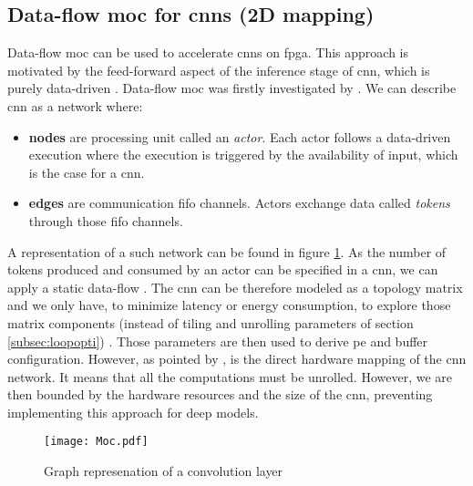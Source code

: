 \subsection{Data-flow \acrshort{moc} for \acrshort{cnn}s (2D mapping)}
%
%
Data-flow \acrfull{moc} can be used to accelerate \acrshort{cnn}s on \acrshort{fpga}. This approach is motivated by the feed-forward aspect of the inference stage of \acrshort{cnn}, which is purely data-driven \cite{abdelouahab_accelerating_2018}. Data-flow \acrfull{moc} was firstly investigated by \cite{lin_li_low_2016}.  We can describe \acrshort{cnn} as a network where:
\begin{itemize}
    \item \textbf{nodes} are processing unit called an \textit{actor}. Each actor follows a data-driven execution where the execution is triggered by the availability of input, which is the case for a \acrshort{cnn}.
    \item \textbf{edges} are communication \acrshort{fifo} channels. Actors exchange data called \textit{tokens} through those \acrshort{fifo} channels.
\end{itemize}
A representation of a such network can be found in figure \ref{fig:moc}. \newline \newline
As the number of tokens produced and consumed by an actor can be specified in a \acrshort{cnn}, we can apply a static data-flow \cite{lee_static_1987}. The \acrshort{cnn} can be therefore modeled as a topology matrix and we only have, to minimize latency or energy consumption, to explore those matrix components (instead of tiling and unrolling parameters of section \ref{subsec:loopopti}) \cite{venieris_latency-driven_2017}. Those parameters are then used to derive \acrshort{pe} and buffer configuration. However, as pointed by \textcite{abdelouahab_tactics_2017}, is the direct hardware mapping of the \acrshort{cnn} network. It means that all the computations must be unrolled. However, we are then bounded by the hardware resources and the size of the \acrshort{cnn}, preventing implementing this approach for deep models.
\begin{figure}
    \centering
    \texttt{[image: Moc.pdf]}
    \caption{Graph represenation of a convolution layer}
    \label{fig:moc}
\end{figure}
%
%
